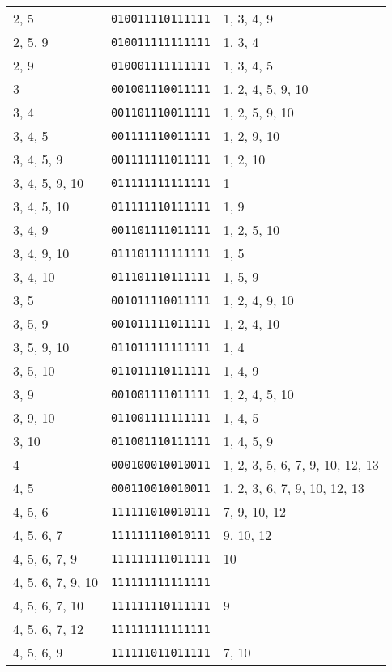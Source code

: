 \documentclass[a4paper,12pt]{article}
\begin{document}
\begin{longtable}{l|l|l}
        2, 5&\texttt{010011110111111}&1, 3, 4, 9\\
        2, 5, 9&\texttt{010011111111111}&1, 3, 4\\
        2, 9&\texttt{010001111111111}&1, 3, 4, 5\\
        3&\texttt{001001110011111}&1, 2, 4, 5, 9, 10\\
        3, 4&\texttt{001101110011111}&1, 2, 5, 9, 10\\
        3, 4, 5&\texttt{001111110011111}&1, 2, 9, 10\\
        3, 4, 5, 9&\texttt{001111111011111}&1, 2, 10\\
        3, 4, 5, 9, 10&\texttt{011111111111111}&1\\
        3, 4, 5, 10&\texttt{011111110111111}&1, 9\\
        3, 4, 9&\texttt{001101111011111}&1, 2, 5, 10\\
        3, 4, 9, 10&\texttt{011101111111111}&1, 5\\
        3, 4, 10&\texttt{011101110111111}&1, 5, 9\\
        3, 5&\texttt{001011110011111}&1, 2, 4, 9, 10\\
        3, 5, 9&\texttt{001011111011111}&1, 2, 4, 10\\
        3, 5, 9, 10&\texttt{011011111111111}&1, 4\\
        3, 5, 10&\texttt{011011110111111}&1, 4, 9\\
        3, 9&\texttt{001001111011111}&1, 2, 4, 5, 10\\
        3, 9, 10&\texttt{011001111111111}&1, 4, 5\\
        3, 10&\texttt{011001110111111}&1, 4, 5, 9\\
        4&\texttt{000100010010011}&1, 2, 3, 5, 6, 7, 9, 10, 12, 13\\
        4, 5&\texttt{000110010010011}&1, 2, 3, 6, 7, 9, 10, 12, 13\\
        4, 5, 6&\texttt{111111010010111}&7, 9, 10, 12\\
        4, 5, 6, 7&\texttt{111111110010111}&9, 10, 12\\
        4, 5, 6, 7, 9&\texttt{111111111011111}&10\\
        4, 5, 6, 7, 9, 10&\texttt{111111111111111}&\\
        4, 5, 6, 7, 10&\texttt{111111110111111}&9\\
        4, 5, 6, 7, 12&\texttt{111111111111111}&\\
        4, 5, 6, 9&\texttt{111111011011111}&7, 10\\

\end{longtable}
\end{document}
